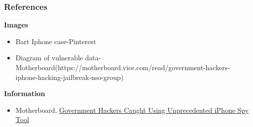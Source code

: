 \documentclass[12pt, notes=none]{beamer}
\begin{document}
\begin{frame}
	\frametitle{References}
	\textbf{Images}
	\begin{itemize}
		\item Bart Iphone case-Pinterest
		\item Diagram of vulnerable data-Motherboard(https://motherboard.vice.com/read/government-hackers-iphone-hacking-jailbreak-nso-group)
	\end{itemize}
	\textbf{Information}
	\begin{itemize}
		\item Motherboard, \href{https://motherboard.vice.com/read/government-hackers-iphone-hacking-jailbreak-nso-group}{Government Hackers Caught Using Unprecedented iPhone Spy Tool}
	\end{itemize}
\end{frame}
\end{document}
